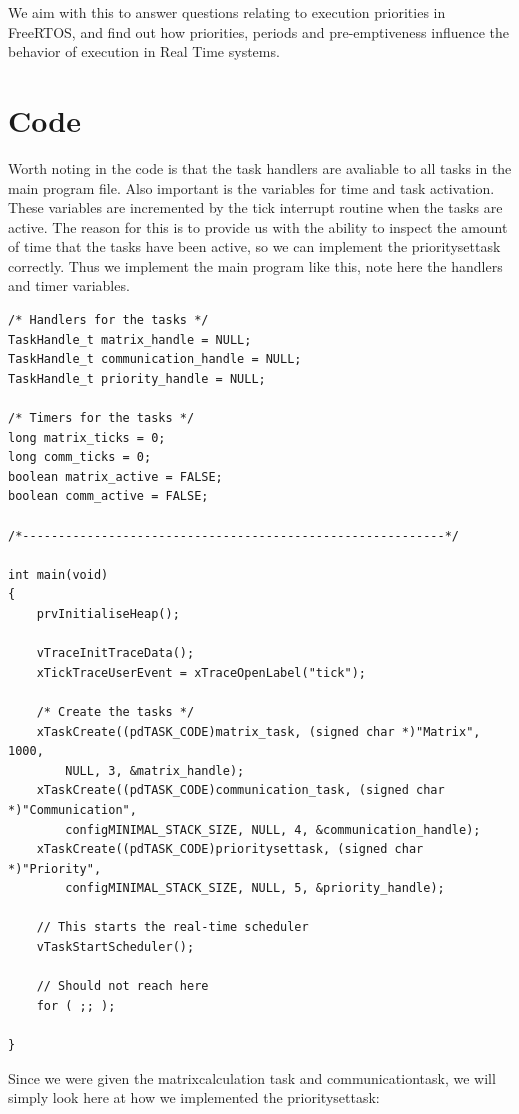 \documentclass[12pt,fleqn,leqno,letterpaper]{article}
\begin{document}
        We aim with this to answer questions relating to execution priorities in FreeRTOS, 
        and find out how priorities, periods and pre-emptiveness influence the behavior of
        execution in Real Time systems.

    \section*{Code}

        Worth noting in the code is that the task handlers are avaliable to all tasks in the main program file.  
        Also important is the variables for time and task activation.  These variables are incremented by the 
        tick interrupt routine when the tasks are active. The reason for this is to provide us with the ability 
        to inspect the amount of time that the tasks have been active, so we can implement the prioritysettask correctly.
        Thus we implement the main program like this, note here the handlers and timer variables.

        \begin{verbatim}
/* Handlers for the tasks */
TaskHandle_t matrix_handle = NULL;
TaskHandle_t communication_handle = NULL;
TaskHandle_t priority_handle = NULL;

/* Timers for the tasks */
long matrix_ticks = 0;
long comm_ticks = 0;
boolean matrix_active = FALSE;
boolean comm_active = FALSE;

/*-----------------------------------------------------------*/

int main(void)
{
    prvInitialiseHeap();

    vTraceInitTraceData();
    xTickTraceUserEvent = xTraceOpenLabel("tick");

    /* Create the tasks */
    xTaskCreate((pdTASK_CODE)matrix_task, (signed char *)"Matrix", 1000, 
        NULL, 3, &matrix_handle);
    xTaskCreate((pdTASK_CODE)communication_task, (signed char *)"Communication",
        configMINIMAL_STACK_SIZE, NULL, 4, &communication_handle);
    xTaskCreate((pdTASK_CODE)prioritysettask, (signed char *)"Priority",
        configMINIMAL_STACK_SIZE, NULL, 5, &priority_handle);
    
    // This starts the real-time scheduler
    vTaskStartScheduler();
    
    // Should not reach here
    for ( ;; );

}
        \end{verbatim}

        Since we were given the matrixcalculation task and communicationtask, we will simply
        look here at how we implemented the prioritysettask:
\end{document}
